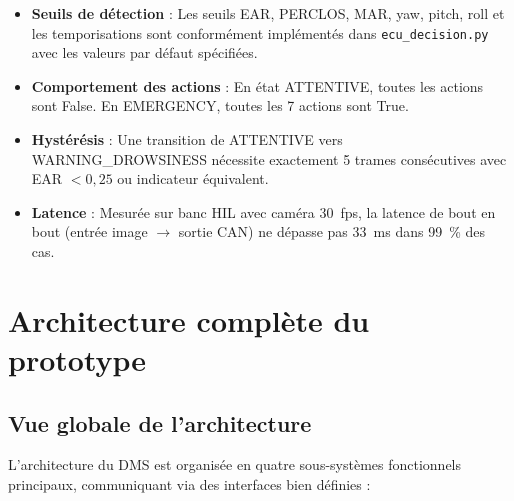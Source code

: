 \documentclass[12pt,a4paper]{report}
\begin{document}
\begin{itemize}
  \item \textbf{Seuils de d\'etection} : Les seuils EAR, PERCLOS, MAR, yaw, pitch, roll et les temporisations sont conform\'ement impl\'ement\'es dans \texttt{ecu\_decision.py} avec les valeurs par d\'efaut sp\'ecifi\'ees.
  \item \textbf{Comportement des actions} : En \'etat ATTENTIVE, toutes les actions sont False. En EMERGENCY, toutes les 7 actions sont True.
  \item \textbf{Hyst\'er\'esis} : Une transition de ATTENTIVE vers WARNING\_DROWSINESS n\'ecessite exactement 5 trames cons\'ecutives avec EAR $<0{,}25$ ou indicateur \'equivalent.
  \item \textbf{Latence} : Mesur\'ee sur banc HIL avec cam\'era 30~fps, la latence de bout en bout (entr\'ee image $\to$ sortie CAN) ne d\'epasse pas 33~ms dans 99~\% des cas.
\end{itemize}

\clearpage

\chapter{Architecture compl\`ete du prototype}

\section{Vue globale de l'architecture}

L'architecture du DMS est organis\'ee en quatre sous-syst\`emes fonctionnels principaux, communiquant via des interfaces bien d\'efinies :
\end{document}

